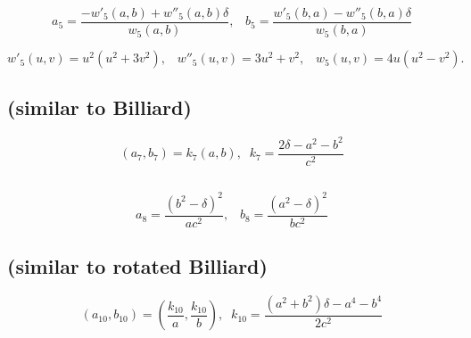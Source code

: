 \begin{equation*}
  a_5=\frac{- w'_5(a,b)+ w''_5(a,b) \delta}{ w_5(a,b)},\;\;\;b_5=\frac{ w'_5(b,a)-{w''_5(b,a) \delta}}{w_5(b,a)}
\end{equation*}
 
\begin{equation*}
 w'_5(u,v)=u^2(u^2+3v^2),\;\;\;w''_5(u,v)=3u^2+ v^2,\;\;\;w_5(u,v)=4u(u^2-v^2).
\end{equation*}

\subsection{ (similar to Billiard)}
    
\begin{equation*}
\left(a_7,b_7\right)=k_7\left(a,b\right),\;\;  k_7=\frac{2\delta - {a}^{2}-{b}^{2}}{c^2}
\end{equation*}

\subsection{}

\begin{equation*}
 a_{8}= {\frac{ ({b}^2-\delta)^2 }{a c^2   }},\;\;\;
 b_{8}={\frac{  ({a}^{2} -\delta )^2  }{b c^2 }}
\end{equation*}

\subsection{ (similar to rotated Billiard)}

\begin{equation*}
\left(a_{10},b_{10}\right)=\left(\frac{k_{10}}{a},\frac{k_{10}}{b}\right),\;\;   k_{10}=\frac{ \left( {a}^{2}+{b}^{2} \right)\delta-{a}^{4}-{b}^{4}}{2 c^2}
\end{equation*}

